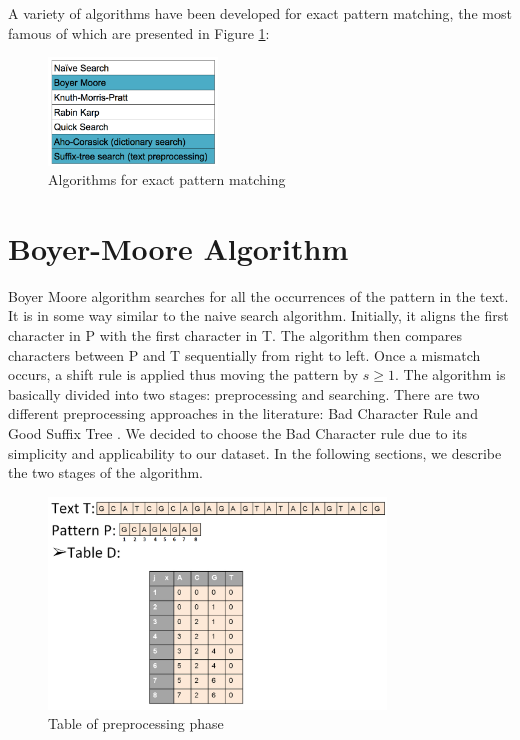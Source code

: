 \documentclass[paper=a4, fontsize=11pt]{scrartcl} %
\numberwithin{equation}{section} %
\numberwithin{figure}{section} %
\numberwithin{table}{section} %
\begin{document}
A variety of algorithms have been developed for exact pattern matching, the most famous of which are presented in Figure \ref{algorithms}:

\begin{figure}[h!]
\centering
\includegraphics[width=0.4\textwidth]{figures/algorithms.png}
\caption{Algorithms for exact pattern matching}
\label{algorithms}
\end{figure}

\newpage

\section{Boyer-Moore Algorithm}
Boyer Moore algorithm \cite{bm_fast} searches for all the occurrences of the pattern in the text. It is in some way similar to the naive search algorithm. Initially, it aligns the first character in P with the first character in T. The algorithm then compares characters between P and T sequentially from right to left. Once a mismatch occurs, a shift rule is applied thus moving the pattern by $s\ge 1$. The algorithm is basically divided into two stages: preprocessing and searching. There are two different preprocessing approaches in the literature: Bad Character Rule and Good Suffix Tree \cite{bm_tbc}. We decided to choose the Bad Character rule due to its simplicity and applicability to our dataset. In the following sections, we describe the two stages of the algorithm.


\begin{figure}[h!]
\centering
\includegraphics[width=0.8\textwidth]{figures/Example_Table.png}
\caption{Table of preprocessing phase}
\label{fig:table}
\end{figure}
\end{document}
